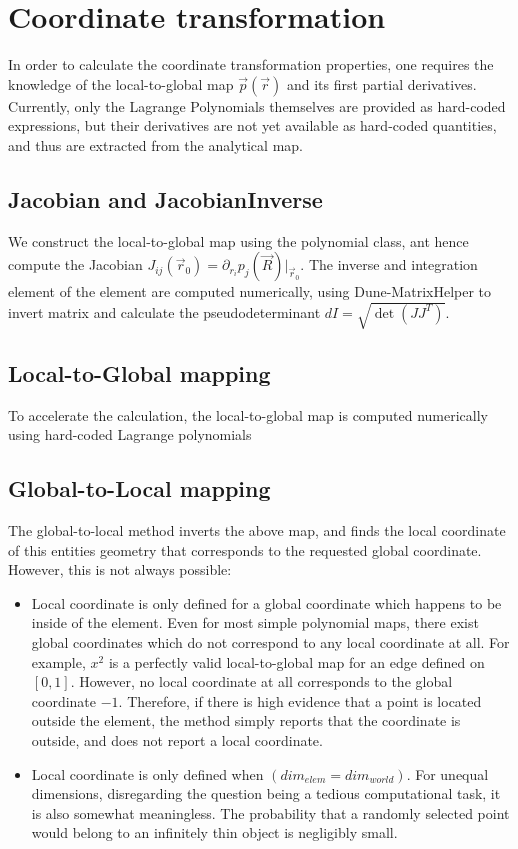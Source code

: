\section{Coordinate transformation}

In order to calculate the coordinate transformation properties, one requires the knowledge of the local-to-global map $\vec{p}(\vec{r})$ and its first partial derivatives. Currently, only the Lagrange Polynomials themselves are provided as hard-coded expressions, but their derivatives are not yet available as hard-coded quantities, and thus are extracted from the analytical map.

\subsection{Jacobian and JacobianInverse}

We construct the local-to-global map using the polynomial class, ant hence compute the Jacobian $J_{ij}(\vec{r}_0) = \partial_{r_i} p_j (\vec{R}) |_{\vec{r}_0}$. The inverse and integration element of the element are computed numerically, using Dune-MatrixHelper to invert matrix and calculate the pseudodeterminant $dI = \sqrt{\det(JJ^T)}$. \\

\subsection{Local-to-Global mapping}

To accelerate the calculation, the local-to-global map is computed numerically using hard-coded Lagrange polynomials

\subsection{Global-to-Local mapping}

The global-to-local method inverts the above map, and finds the local coordinate of this entities geometry that corresponds to the requested global coordinate. However, this is not always possible:
\begin{itemize}
	\item Local coordinate is only defined for a global coordinate which happens to be inside of the element. Even for most simple polynomial maps, there exist global coordinates which do not correspond to any local coordinate at all. For example, $x^2$ is a perfectly valid local-to-global map for an edge defined on $[0,1]$. However, no local coordinate at all corresponds to the global coordinate $-1$. Therefore, if there is high evidence that a point is located outside the element, the method simply reports that the coordinate is outside, and does not report a local coordinate.
	\item Local coordinate is only defined when $(dim_{elem} = dim_{world})$. For unequal dimensions, disregarding the question being a tedious computational task, it is also somewhat meaningless. The probability that a randomly selected point would belong to an infinitely thin object is negligibly small. 
\end{itemize}

